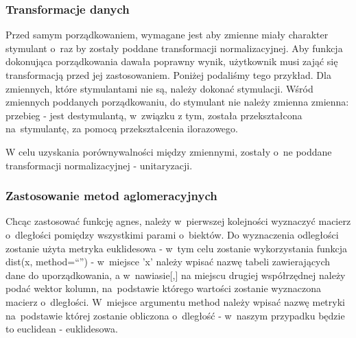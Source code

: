 \documentclass[12pt,a4paper]{report}
\begin{document}
{\subsubsection{Transformacje danych}\label{transformacje-danych}

Przed samym porządkowaniem, wymagane jest aby zmienne miały charakter
stymulant o~raz by zostały poddane transformacji normalizacyjnej. Aby
funkcja dokonująca porządkowania dawała poprawny wynik, użytkownik musi
zająć się transformacją przed jej zastosowaniem. Poniżej podaliśmy tego
przykład. Dla zmiennych, które stymulantami nie są, należy dokonać
stymulacji. Wśród zmiennych poddanych porządkowaniu, do stymulant
nie należy zmienna zmienna: przebieg - jest destymulantą, w~związku z
tym, została przekształcona na~stymulantę, za pomocą przekształcenia
ilorazowego.


\begin{Shaded}
\begin{Highlighting}[]
\NormalTok{)}
\end{Highlighting}
\end{Shaded}

W celu uzyskania porównywalności między zmiennymi, zostały o~ne poddane
transformacji normalizacyjnej - unitaryzacji.

\begin{Shaded}
\begin{Highlighting}[]
\end{Highlighting}
\end{Shaded}

\subsubsection{Zastosowanie metod aglomeracyjnych}


Chcąc zastosować funkcję agnes, należy w~pierwszej kolejności wyznaczyć
macierz o~dległości pomiędzy wszystkimi parami o~biektów. Do wyznaczenia
odległości zostanie użyta metryka euklidesowa - w~tym celu zostanie
wykorzystania funkcja dist(x, method=``'') - w~miejsce 'x' należy wpisać
nazwę tabeli zawierających dane do uporządkowania, a w~nawiasie{[},{]}
na miejscu drugiej współrzędnej należy podać wektor kolumn, na~podstawie
którego wartości zostanie wyznaczona macierz o~dległości. W~miejsce
argumentu method należy wpisać nazwę metryki na~podstawie której zostanie
obliczona o~dległość - w~naszym przypadku będzie to euclidean -
euklidesowa.

}
\end{document}
